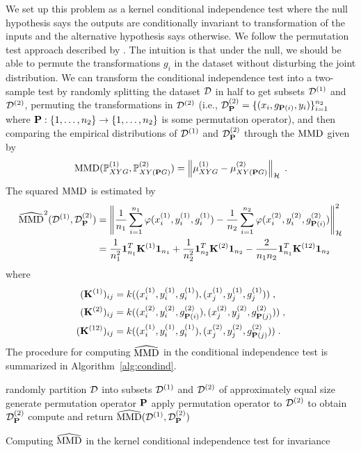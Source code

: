 We set up this problem as a kernel conditional independence test where the null hypothesis says the outputs are conditionally invariant to transformation of the inputs and the alternative hypothesis says otherwise. We follow the permutation test approach described by \textcite{Doran:2014}. The intuition is that under the null, we should be able to permute the transformations $g_i$ in the dataset without disturbing the joint distribution. We can transform the conditional independence test into a two-sample test by randomly splitting the dataset $\mathcal{D}$ in half to get subsets $\mathcal{D}^{(1)}$ and $\mathcal{D}^{(2)}$, permuting the transformations in $\mathcal{D}^{(2)}$ (i.e., $\mathcal{D}_{\mathbf{P}}^{(2)}=\{(x_i,g_{\mathbf{P}(i)},y_i)\}_{i=1}^{n_2}$ where $\mathbf{P}:\{1,\ldots,n_2\}\rightarrow\{1,\ldots,n_2\}$ is some permutation operator), and then comparing the empirical distributions of $\mathcal{D}^{(1)}$ and $\mathcal{D}_{\mathbf{P}}^{(2)}$ through the $\mathrm{MMD}$ given by
\[
\mathrm{MMD}(\mathbb{P}_{XYG}^{(1)},\mathbb{P}_{XY(\mathbf{P} G)}^{(2)}) = \left\|\mu_{XYG}^{(1)}-\mu_{XY(\mathbf{P} G)}^{(2)}\right\|_{\mathcal{H}} \;.
\]
The squared $\mathrm{MMD}$ is estimated by
\begin{align*}
\widehat{\mathrm{MMD}}^2(\mathcal{D}^{(1)},\mathcal{D}_{\mathbf{P}}^{(2)}) &= \left\|\frac{1}{n_1}\sum_{i=1}^{n_1}\varphi(x^{(1)}_i,y^{(1)}_i,g^{(1)}_i) - \frac{1}{n_2}\sum_{i=1}^{n_2}\varphi(x^{(2)}_i,y^{(2)}_i,g^{(2)}_{\mathbf{P}(i)})\right\|_{\mathcal{H}}^2 \\
&= \frac{1}{n_1^2}\mathbf{1}_{n_1}^T\mathbf{K}^{(1)}\mathbf{1}_{n_1} + \frac{1}{n_2^2}\mathbf{1}_{n_2}^T\mathbf{K}^{(2)}\mathbf{1}_{n_2} - \frac{2}{n_1n_2}\mathbf{1}_{n_1}^T\mathbf{K}^{(12)}\mathbf{1}_{n_2}
\end{align*}
where
\begin{align*}
(\mathbf{K}^{(1)})_{ij} &= k((x^{(1)}_i,y^{(1)}_i,g^{(1)}_i),(x^{(1)}_j,y^{(1)}_j,g^{(1)}_j)) \;, \\
(\mathbf{K}^{(2)})_{ij} &= k((x^{(2)}_i,y^{(2)}_i,g^{(2)}_{\mathbf{P}(i)}),(x^{(2)}_j,y^{(2)}_j,g^{(2)}_{\mathbf{P}(j)})) \;, \\
(\mathbf{K}^{(12)})_{ij} &= k((x^{(1)}_i,y^{(1)}_i,g^{(1)}_i),(x^{(2)}_j,y^{(2)}_j,g^{(2)}_{\mathbf{P}(j)})) \;.
\end{align*}
The procedure for computing $\widehat{\mathrm{MMD}}$ in the conditional independence test is summarized in Algorithm~\ref{alg:condind}.
\\

\begin{algorithm}[H]
\SetAlgoLined
{}
\BlankLine
randomly partition $\mathcal{D}$ into subsets $\mathcal{D}^{(1)}$ and $\mathcal{D}^{(2)}$ of approximately equal size\;
generate permutation operator $\mathbf{P}$\;
apply permutation operator to $\mathcal{D}^{(2)}$ to obtain $\mathcal{D}_{\mathbf{P}}^{(2)}$\;
compute and return $\widehat{\mathrm{MMD}}(\mathcal{D}^{(1)},\mathcal{D}_{\mathbf{P}}^{(2)})$\;
\caption{Computing $\widehat{\mathrm{MMD}}$ in the kernel conditional independence test for invariance}
\label{alg:condind}
\end{algorithm}
\vspace{1em}

